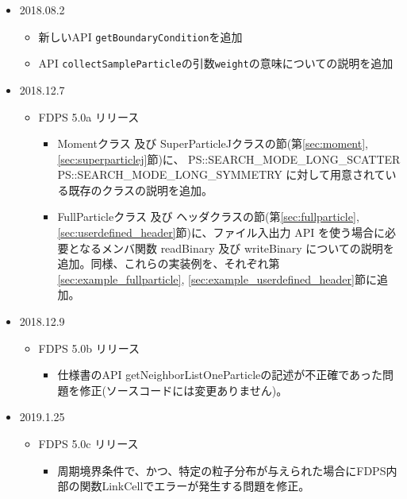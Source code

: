 \begin{itemize}
  \item 2018.08.2
    \begin{itemize}
    \item 新しいAPI \texttt{getBoundaryCondition}を追加
    \item API \texttt{collectSampleParticle}の引数\texttt{weight}の意味についての説明を追加
    \end{itemize}

  \item 2018.12.7
    \begin{itemize}
    \item FDPS 5.0a リリース
       \begin{itemize}
          \item Momentクラス 及び SuperParticleJクラスの節(第\ref{sec:moment},\ref{sec:superparticlej}節)に、\newline
          PS::SEARCH\_MODE\_LONG\_SCATTER \newline
          PS::SEARCH\_MODE\_LONG\_SYMMETRY \newline
          に対して用意されている既存のクラスの説明を追加。
          \item FullParticleクラス 及び ヘッダクラスの節(第\ref{sec:fullparticle}, \ref{sec:userdefined_header}節)に、ファイル入出力 API を使う場合に必要となるメンバ関数 readBinary 及び writeBinary についての説明を追加。同様、これらの実装例を、それぞれ第\ref{sec:example_fullparticle}, \ref{sec:example_userdefined_header}節に追加。
       \end{itemize}
    \end{itemize}

  \item 2018.12.9
    \begin{itemize}
    \item FDPS 5.0b リリース
       \begin{itemize}
          \item 仕様書のAPI getNeighborListOneParticleの記述が不正確であった問題を修正(ソースコードには変更ありません)。
       \end{itemize}
    \end{itemize}

  \item 2019.1.25
    \begin{itemize}
    \item FDPS 5.0c リリース
       \begin{itemize}
          \item 周期境界条件で、かつ、特定の粒子分布が与えられた場合にFDPS内部の関数LinkCellでエラーが発生する問題を修正。
       \end{itemize}
    \end{itemize}


\end{itemize}
